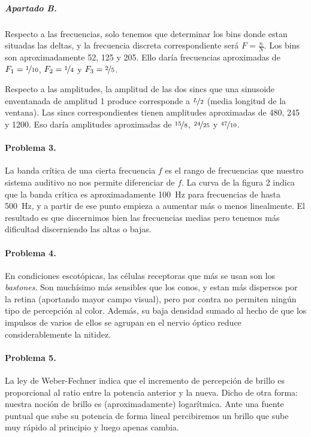 \subparagraph{Apartado B.}

Respecto a las frecuencias, solo tenemos que determinar los bins donde estan
situadas las deltas, y la frecuencia discreta correspondiente será
$F = \frac{n}{N}$. Los bins son aproximadamente \num{52}, \num{125} y \num{205}.
Ello daría frecuencias aproximadas de $F_1 = \nicefrac{1}{10}$, $F_2 = \nicefrac{1}{4}$ y $F_3 = \nicefrac{2}{5}$.

Respecto a las amplitudes, la amplitud de las dos sincs que una sinusoide
enventanada de amplitud 1 produce corresponde a $\nicefrac{L}{2}$ (media
longitud de la ventana). Las sincs correspondientes tienen amplitudes
aproximadas de \num{480}, \num{245} y \num{1200}. Eso daría amplitudes
aproximadas de $\nicefrac{15}{8}$, $\nicefrac{24}{25}$ y $\nicefrac{47}{10}$.

\finishpage


\startpage
\paragraph{Problema 3.}

La banda crítica de una cierta frecuencia $f$ es el rango de frecuencias que nuestro sistema auditivo no nos permite diferenciar de $f$. La curva de la
figura 2 indica que la banda crítica es aproximadamente \SI{100}{\hertz} para
frecuencias de hasta \SI{500}{\hertz}, y a partir de ese punto empieza a
aumentar más o menos linealmente. El resultado es que discernimos bien las
frecuencias medias pero tenemos más dificultad discerniendo las altas o bajas.

\paragraph{Problema 4.}

En condiciones escotópicas, las células receptoras que más se usan son los
\emph{bastones}. Son muchísimo más sensibles que los conos, y estan más
dispersos por la retina (aportando mayor campo visual), pero por contra no
permiten ningún tipo de percepción al color. Además, su baja densidad sumado
al hecho de que los impulsos de varios de ellos se agrupan en el nervio óptico
reduce considerablemente la nitidez.

\paragraph{Problema 5.}

La ley de Weber-Fechner indica que el incremento de percepción de brillo es
proporcional al ratio entre la potencia anterior y la nueva. Dicho de otra
forma: nuestra noción de brillo es (aproximadamente) logarítmica. Ante una
fuente puntual que sube su potencia de forma lineal percibiremos un brillo que
sube muy rápido al principio y luego apenas cambia.

